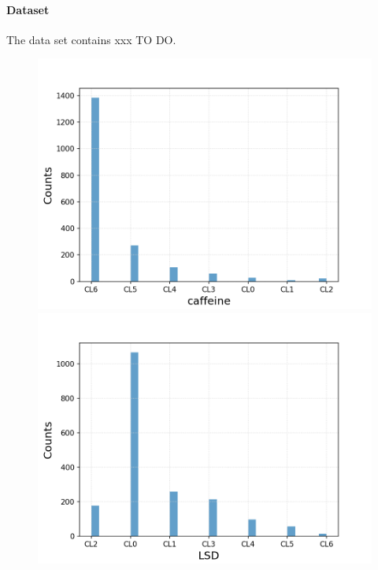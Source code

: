 \documentclass{article}
\begin{document}
\clearpage
\paragraph{Dataset}

\noindent The data set contains xxx TO DO.

\begin{figure}[h!]
	\centering
	\begin{minipage}[b]{0.32\textwidth}
		\includegraphics[width=\textwidth]{plots/drugsPlots/caffeine.png}
		
	\end{minipage}
	\begin{minipage}[b]{0.32\textwidth}
		\includegraphics[width=\textwidth]{plots/drugsPlots/LSD.png}
		

\end{minipage}
\end{figure}
\end{document}

